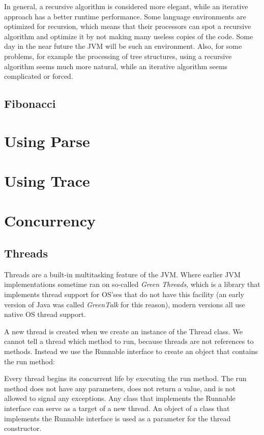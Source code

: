 {{In general, a recursive algorithm is considered more elegant, while an
iterative approach has a better runtime performance. Some language
environments are optimized for recursion, which means that their
processors can spot a recursive algorithm and optimize it by not
making many useless copies of the code. Some day in the near future
the JVM will be such an environment. Also, for some problems, for example
the processing of tree structures, using a recursive algorithm seems
much more natural, while an iterative algorithm seems complicated or forced.
\section{Fibonacci}

\chapter{Using Parse}
\chapter{Using Trace}

\chapter{Concurrency}
\section{Threads}
Threads are a built-in multitasking feature of the JVM. Where earlier
JVM implementations sometime ran on so-called \emph{Green Threads},
which is a library that implements thread support for OS'ses that do
not have this facility (an
early version of Java was called \emph{GreenTalk} for this reason), modern versions
all use native OS thread support. 

A new thread is created when we create an instance of the Thread class. We cannot tell a thread which method to run, because threads are not references to methods. Instead we use the Runnable interface to create an object that contains the run method:

Every thread begins its concurrent life by executing the run method. The run method does not have any parameters, does not return a value, and is not allowed to signal any exceptions.
Any class that implements the Runnable interface can serve as a target of a new thread. An object of a class that implements the Runnable interface is used as a parameter for the thread constructor.

}}
